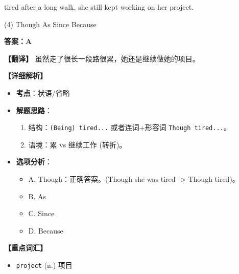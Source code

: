 \documentclass[11pt, a4paper]{article}
\newcommand{\analysis}[4]{
    \begin{solutionbox}
        \textbf{答案：#1}
        
        \textbf{【翻译】} #2
        
        \textbf{【详细解析】}
        #3
        
        \textbf{【重点词汇】}
        #4
    \end{solutionbox}
}
\newcommand{\blank}{\underline{\hspace{1.5cm}}}
\begin{document}
\begin{questions}
    \item \blank tired after a long walk, she still kept working on her project.
    \begin{tasks}(4)
        \task Though \task As \task Since \task Because
    \end{tasks}
    \analysis{A}{虽然走了很长一段路很累，她还是继续做她的项目。}{
        \begin{itemize}
            \item \textbf{考点}：状语/省略
            \item \textbf{解题思路}：
                \begin{enumerate}
                    \item 结构：\texttt{(Being) tired...} 或者连词+形容词 \texttt{Though tired...}。
                    \item 语境：累 vs 继续工作 (转折)。
                \end{enumerate}
            \item \textbf{选项分析}：
                \begin{itemize}
                    \item A. Though：正确答案。(Though she was tired -> Though tired)。
                    \item B. As
                    \item C. Since
                    \item D. Because
                \end{itemize}
        \end{itemize}
    }{
        \begin{itemize}
            \item \texttt{project} (n.) 项目
        \end{itemize}
    }
\end{questions}

\end{document}
